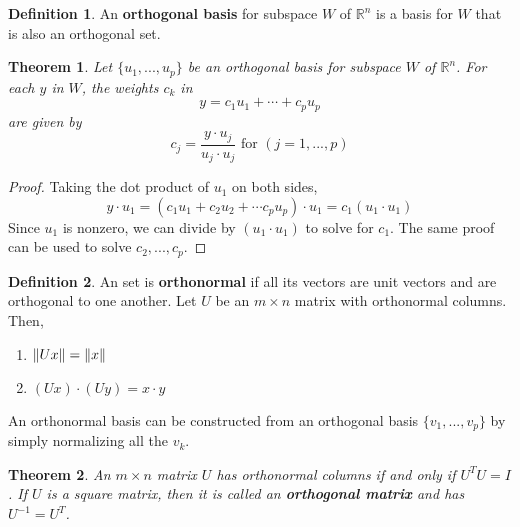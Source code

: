 \documentclass[letterpaper]{article}
\newtheorem{theorem}{Theorem}
\theoremstyle{definition}
\newtheorem{definition}{Definition}[section]
\DeclarePairedDelimiter{\norm}{\lVert}{\rVert}
\begin{document}
\begin{definition}
An \textbf{orthogonal basis} for subspace $W$ of $\mathbb{R}^n$ is a basis for $W$ that is also an orthogonal set. 
\end{definition}

\begin{theorem}
Let $\{ u_1, ..., u_p\}$ be an orthogonal basis for subspace $W$ of $\mathbb{R}^n$. For each $y$ in $W$, the weights $c_k$ in 
$$y = c_1 u_1 + \cdots + c_p u_p $$
are given by 
$$c_j = \frac{y \cdot u_j}{u_j \cdot u_j} \text{ for } (j = 1, ..., p)$$
\end{theorem}

\begin{proof}
Taking the dot product of $u_1$ on both sides, 
$$y \cdot u_1 = (c_1 u_1 + c_2 u_2 + \cdots c_p u_p) \cdot u_1 = c_1 (u_1 \cdot u_1)$$
Since $u_1$ is nonzero, we can divide by $(u_1 \cdot u_1)$ to solve for $c_1$. The same proof can be used to solve $c_2 , ..., c_p$. 
\end{proof}

\begin{definition}
An set is \textbf{orthonormal} if all its vectors are unit vectors and are orthogonal to one another. Let $U$ be an $m \times n$ matrix with orthonormal columns. Then, 
\begin{enumerate}
	\item $\norm{Ux} = \norm{x}$
	\item $(Ux) \cdot (Uy) = x \cdot y$
\end{enumerate}

An orthonormal basis can be constructed from an orthogonal basis $\{v_1, ..., v_p\}$ by simply normalizing all the $v_k$.
\end{definition}

\begin{theorem}
An $m \times n$ matrix $U$ has orthonormal columns if and only if $U^T U = I$. If $U$ is a square matrix, then it is called an \textbf{orthogonal matrix} and has $U^{-1} = U^{T}$. 
\end{theorem}
\end{document}
